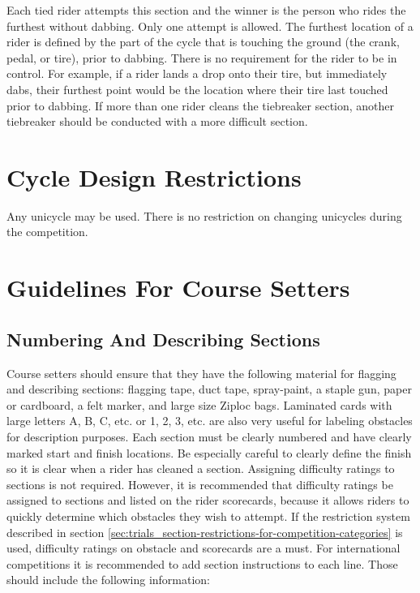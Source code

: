Each tied rider attempts this section and the winner is the person who rides the furthest without dabbing.
Only one attempt is allowed. 
The furthest location of a rider is defined by the part of the cycle that is touching the ground (the crank, pedal, or tire), prior to dabbing. 
There is no requirement for the rider to be in control. 
For example, if a rider lands a drop onto their tire, but immediately dabs, their furthest point would be the location where their tire last touched prior to dabbing.
If more than one rider cleans the tiebreaker section, another tiebreaker should be conducted with a more difficult section.

\section{Cycle Design Restrictions}
Any unicycle may be used. 
There is no restriction on changing unicycles during the competition.

\section{Guidelines For Course Setters}

\subsection{Numbering And Describing Sections}
Course setters should ensure that they have the following material for flagging and describing sections:
flagging tape, duct tape, spray-paint, a staple gun, paper or cardboard, a felt marker, and large size Ziploc bags. 
Laminated cards with large letters A, B, C, etc. or 1, 2, 3, etc. are also very useful for labeling obstacles for description purposes.
Each section must be clearly numbered and have clearly marked start and finish locations. 
Be especially careful to clearly define the finish so it is clear when a rider has cleaned a section.
Assigning difficulty ratings to sections is not required. 
However, it is recommended that difficulty ratings be assigned to sections and listed on the rider scorecards, because it allows riders to quickly determine which obstacles they wish to attempt. 
If the restriction system described in section \ref{sec:trials_section-restrictions-for-competition-categories} is used, difficulty ratings on obstacle and scorecards are a must. 
For international competitions it is recommended to add section instructions to each line. 
Those should include the following information:

